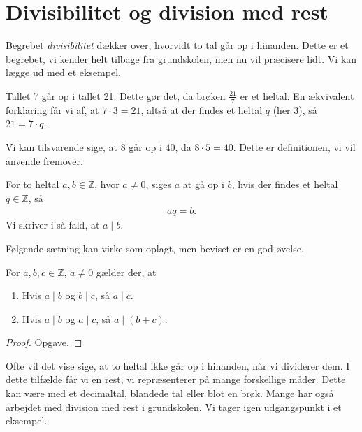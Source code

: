 \section*{Divisibilitet og division med rest}
Begrebet \textit{divisibilitet} dækker over, hvorvidt to tal går op i hinanden. Dette er et begrebet, vi kender helt tilbage fra grundskolen, men nu vil præcisere lidt. Vi kan lægge ud med et eksempel.
\begin{exa}
	Tallet 7 går op i tallet 21. Dette gør det, da brøken $\frac{21}{7}$ er et heltal. En ækvivalent forklaring får vi 
	af, at $7 \cdot 3 = 21$, altså at der findes et heltal $q$ (her 3), så $21 = 7\cdot q$. 
	
	Vi kan tilsvarende sige, at $8$ går op i $40$, da $8\cdot 5 = 40$. Dette er definitionen, vi vil anvende fremover. 
\end{exa}
\begin{defn}[Divisibilitet]
	For to heltal $a,b \in \mathbb{Z}$, hvor $a\neq 0$, siges $a$ at gå op i $b$,
	hvis der findes et heltal $q\in \mathbb{Z}$, så
	\begin{align*}
		aq = b.
	\end{align*}
	Vi skriver i så fald, at $a \mid b$. 
\end{defn}

Følgende sætning kan virke som oplagt, men beviset er en god øvelse.
\begin{setn}
	For $a,b,c\in \mathbb{Z}$, $a\neq 0$ gælder der, at 
	\begin{enumerate}[label=\roman*)]
		\item Hvis $a \mid b$ og $b \mid c$, så $a \mid c$.
		\item Hvis $a \mid b$ og $a \mid c$, så $a \mid (b + c)$.
	\end{enumerate}
\end{setn}
\begin{proof}
	Opgave.
\end{proof}
Ofte vil det vise sige, at to heltal ikke går op i hinanden, når vi dividerer dem. I dette tilfælde får vi en rest, vi repræsenterer på mange forskellige måder. Dette kan være med et decimaltal, blandede tal eller blot en brøk. Mange har også arbejdet med division med rest i grundskolen. Vi tager igen udgangspunkt i et eksempel.

